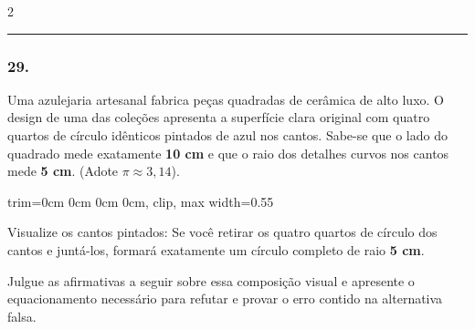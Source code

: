 \documentclass[twoside, 10pt, a4paper]{article}
\newlength{\espacoPreQuestao}\setlength{\espacoPreQuestao}{0.1cm}
\begin{document}
\begin{multicols*}{2}
\noindent\textcolor{CorLinha}{\rule{\linewidth}{0.5pt}} 
\par\vspace{\espacoPreQuestao}
\subsubsection*{29.} Uma azulejaria artesanal fabrica peças quadradas de cerâmica de alto luxo. O design de uma das coleções apresenta a superfície clara original com quatro quartos de círculo idênticos pintados de azul nos cantos. Sabe-se que o lado do quadrado mede exatamente \textbf{10 cm} e que o raio dos detalhes curvos nos cantos mede \textbf{5 cm}. (Adote $ \pi \approx 3,14 $).

\begin{center}
\begin{adjustbox}{trim=0cm 0cm 0cm 0cm, clip, max width=0.55\linewidth}
\end{adjustbox}
\end{center}

\begin{boxdica}
Visualize os cantos pintados: Se você retirar os quatro quartos de círculo dos cantos e juntá-los, formará exatamente um círculo completo de raio \textbf{5 cm}.
\end{boxdica}

Julgue as afirmativas a seguir sobre essa composição visual e apresente o equacionamento necessário para refutar e provar o erro contido na alternativa falsa.


\end{multicols*}
\end{document}
